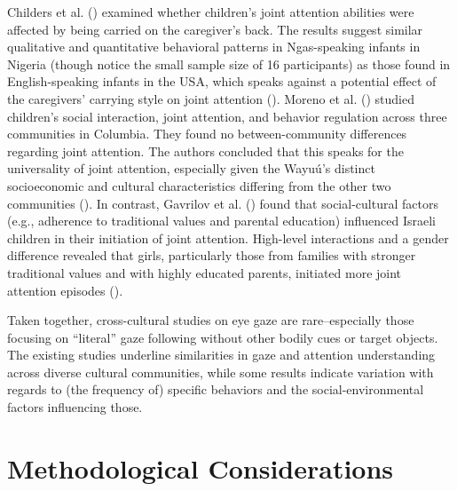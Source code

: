 \documentclass[
]{scrbook}
\begin{document}
Childers et al. () examined whether children's joint attention abilities were affected by being carried on the caregiver's back. The results suggest similar qualitative and quantitative behavioral patterns in Ngas-speaking infants in Nigeria (though notice the small sample size of 16 participants) as those found in English-speaking infants in the USA, which speaks against a potential effect of the caregivers' carrying style on joint attention (). Moreno et al. () studied children's social interaction, joint attention, and behavior regulation across three communities in Columbia. They found no between-community differences regarding joint attention. The authors concluded that this speaks for the universality of joint attention, especially given the Wayuú's distinct socioeconomic and cultural characteristics differing from the other two communities (). In contrast, Gavrilov et al. () found that social-cultural factors (e.g., adherence to traditional values and parental education) influenced Israeli children in their initiation of joint attention. High-level interactions and a gender difference revealed that girls, particularly those from families with stronger traditional values and with highly educated parents, initiated more joint attention episodes ().

Taken together, cross-cultural studies on eye gaze are rare\thinspace --\thinspace especially those focusing on ``literal'' gaze following without other bodily cues or target objects. The existing studies underline similarities in gaze and attention understanding across diverse cultural communities, while some results indicate variation with regards to (the frequency of) specific behaviors and the social-environmental factors influencing those.

\section{Methodological Considerations}\label{intro-methods}
\end{document}
